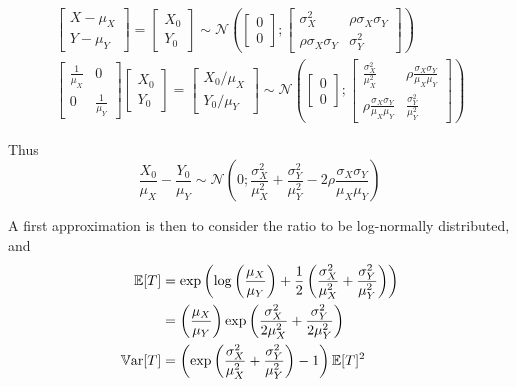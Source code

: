 \documentclass[../../Main_ManuscritThese.tex]{subfiles}
\begin{document}
  \begin{align}
    \begin{bmatrix}
      X - \mu_X \\ Y - \mu_Y
    \end{bmatrix} = 
    \begin{bmatrix}
      X_0 \\ Y_0
    \end{bmatrix} \sim \mathcal{N}\left(%
    \begin{bmatrix}
      0 \\ 0
    \end{bmatrix};%
    \begin{bmatrix}
      \sigma^2_X  & \rho \sigma_X \sigma_Y \\
      \rho\sigma_X \sigma_Y & \sigma^2_Y
    \end{bmatrix} \right)%
    \\
    \begin{bmatrix}
      \frac{1}{\mu_X} & 0 \\
      0 & \frac{1}{\mu_Y}
    \end{bmatrix}
    \begin{bmatrix}
      X_0 \\ Y_0
    \end{bmatrix}=
    \begin{bmatrix}
      X_0/\mu_X \\ Y_0/ \mu_Y
    \end{bmatrix} \sim \mathcal{N}\left(%
    \begin{bmatrix}
      0 \\ 0
    \end{bmatrix};%
    \begin{bmatrix}
      \frac{\sigma^2_X}{\mu_X^2}  & \rho \frac{\sigma_X \sigma_Y}{\mu_X \mu_Y} \\
      \rho \frac{\sigma_X \sigma_Y}{\mu_X \mu_Y}& \frac{\sigma^2_Y}{\mu_Y^2}
    \end{bmatrix} \right)%
  \end{align}

  Thus
  \begin{equation}
    \frac{X_0}{\mu_X} - \frac{Y_0}{\mu_Y} \sim \mathcal{N}\left(0;\frac{\sigma^2_X}{\mu_X^2} + \frac{\sigma^2_Y}{\mu_Y^2} - 2 \rho \frac{\sigma_X \sigma_Y}{\mu_X \mu_Y} \right)
  \end{equation}
  
  A first approximation is then to consider the ratio to be log-normally distributed, and
  \begin{align}
    \mathbb{E}[T] &= \exp\left(\log\left(\frac{\mu_X}{\mu_Y}\right) + \frac{1}{2}\left(\frac{\sigma_X^2}{\mu_X^2}+\frac{\sigma_Y^2}{\mu_Y^2} \right)\right)\\
           &=\left(\frac{\mu_X}{\mu_Y}\right) \exp\left(\frac{\sigma_X^2}{2\mu_X^2}+\frac{\sigma_Y^2}{2\mu_Y^2}\right) \\
    \mathbb{V}\mathrm{ar}[T] &= \left(\exp\left(\frac{\sigma_X^2}{\mu_X^2}+\frac{\sigma_Y^2}{\mu_Y^2}\right)-1 \right)\mathbb{E}[T]^2
  \end{align}
\end{document}
